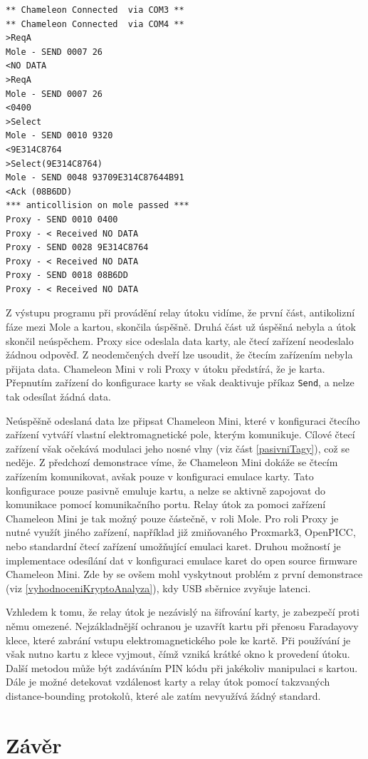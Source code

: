 \begin{lstlisting}[caption=Výstup programu MifareProxy.exe při demonstraci, label={relayZaznam}]
** Chameleon Connected  via COM3 **
** Chameleon Connected  via COM4 **
>ReqA
Mole - SEND 0007 26
<NO DATA
>ReqA
Mole - SEND 0007 26
<0400
>Select
Mole - SEND 0010 9320
<9E314C8764
>Select(9E314C8764)
Mole - SEND 0048 93709E314C87644B91
<Ack (08B6DD)
*** anticollision on mole passed ***
Proxy - SEND 0010 0400
Proxy - < Received NO DATA
Proxy - SEND 0028 9E314C8764
Proxy - < Received NO DATA
Proxy - SEND 0018 08B6DD
Proxy - < Received NO DATA
\end{lstlisting}
Z výstupu programu při provádění relay útoku vidíme, že první část, antikolizní fáze mezi Mole a kartou, skončila úspěšně. Druhá část už úspěšná nebyla a útok skončil neúspěchem. Proxy sice odeslala data karty, ale čtecí zařízení neodeslalo žádnou odpověď. Z neodemčených dveří lze usoudit, že čtecím zařízením nebyla přijata data. Chameleon Mini v roli Proxy v útoku předstírá, že je karta. Přepnutím zařízení do konfigurace karty se však deaktivuje příkaz \verb|Send|, a nelze tak odesílat žádná data. \par
Neúspěšně odeslaná data lze připsat Chameleon Mini, které v konfiguraci čtecího zařízení vytváří vlastní elektromagnetické pole, kterým komunikuje. Cílové čtecí zařízení však očekává modulaci jeho nosné vlny (viz část \ref{pasivniTagy}), což se neděje. Z předchozí demonstrace víme, že Chameleon Mini dokáže se čtecím zařízením komunikovat, avšak pouze v konfiguraci emulace karty. Tato konfigurace pouze pasivně emuluje kartu, a nelze se aktivně zapojovat do komunikace pomocí komunikačního portu. Relay útok za pomoci zařízení Chameleon Mini je tak možný pouze částečně, v roli Mole. Pro roli Proxy je nutné využít jiného zařízení, například již zmiňovaného Proxmark3, OpenPICC, nebo standardní čtecí zařízení umožňující emulaci karet. Druhou možností je implementace odesílání dat v konfiguraci emulace karet do open source firmware Chameleon Mini. Zde by se ovšem mohl vyskytnout problém z první demonstrace (viz \ref{vyhodnoceniKryptoAnalyza}), kdy USB sběrnice zvyšuje latenci.\par
Vzhledem k tomu, že relay útok je nezávislý na šifrování karty, je zabezpečí proti němu omezené. Nejzákladnější ochranou je uzavřít kartu při přenosu Faradayovy klece, které zabrání vstupu elektromagnetického pole ke kartě. Při používání je však nutno kartu z klece vyjmout, čímž vzniká krátké okno k provedení útoku. Další metodou může být zadáváním PIN kódu při jakékoliv manipulaci s kartou. Dále je možné detekovat vzdálenost karty a relay útok pomocí takzvaných {distance-bounding} protokolů, které ale zatím nevyužívá žádný standard.

\chapter{Závěr}
\label{zaver}


